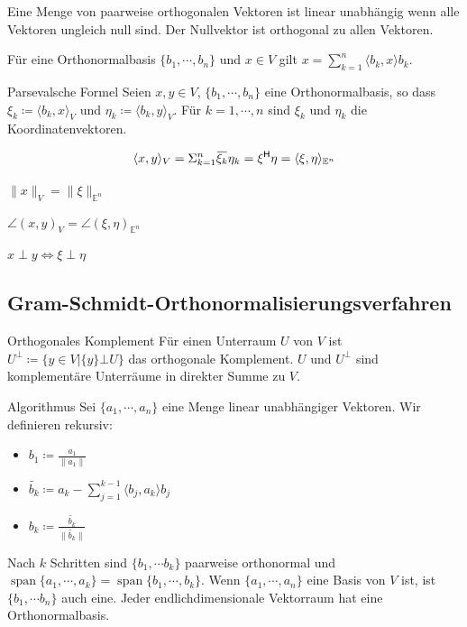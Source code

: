 \documentclass[a4paper,10pt]{article}
\DeclareMathOperator{\Span}{span}
\newcommand*{\hermconj}{\mathsf{H}}
\def\E{\mathbb{E}}
\newcommand{\overbar}[1]{\mkern 1.5mu\overline{\mkern-1.5mu#1\mkern-1.5mu}\mkern 1.5mu}
\begin{document}
Eine Menge von paarweise orthogonalen Vektoren ist linear unabhängig wenn alle Vektoren ungleich null sind. Der Nullvektor ist orthogonal zu allen Vektoren.

Für eine Orthonormalbasis $\{b_1, \cdots, b_n\}$ und $x \in V$ gilt $x = \sum_{k=1}^n \langle b_k, x \rangle b_k$.

\begin{mainbox}{Parsevalsche Formel}
  Seien $x, y \in V$, $\{ b_1, \cdots, b_n \}$ eine Orthonormalbasis, so dass $\xi_k \coloneqq \langle b_k, x \rangle_V$ und $\eta_k \coloneqq \langle b_k, y \rangle_V$. Für $k = 1, \cdots, n$ sind $\xi_k$ und $\eta_k$ die Koordinatenvektoren. 

  $$\langle x, y \rangle_V = \Sigma_{k=1}^n \overbar{\xi_k} \eta_k = \xi^\hermconj \eta = \langle \xi, \eta \rangle_{\E^n}$$

  \begin{rowlist}
    \item $\lVert x \rVert_V = \lVert \xi \rVert_{\E^n}$
    \item $\angle (x,y)_V = \angle (\xi, \eta)_{\E^n}$
    \item $x \perp y \iff \xi \perp \eta$
  \end{rowlist}
\end{mainbox}

\subsection{Gram-Schmidt-Orthonormalisierungsverfahren}

\begin{subbox}{Orthogonales Komplement}
  Für einen Unterraum $U$ von $V$ ist $U^\bot \coloneqq \{ y \in V | \{y\} \bot U \}$ das orthogonale Komplement. $U$ und $U^\bot$ sind komplementäre Unterräume in direkter Summe zu $V$.
\end{subbox}

\begin{mainbox}{Algorithmus}
  Sei $\{a_1, \cdots, a_n\}$ eine Menge linear unabhängiger Vektoren. Wir definieren rekursiv:
  \begin{itemize}
    \item $b_1 \coloneqq \frac{a_1}{\lVert a_1 \rVert}$
    \item $\widetilde{b_k} \coloneqq a_k - \sum_{j=1}^{k-1} \langle b_j, a_k \rangle b_j$
    \item $b_k \coloneqq \frac{\widetilde{b_k}}{\lVert \widetilde{b_k} \rVert}$
  \end{itemize}

  Nach $k$ Schritten sind $\{b_1, \cdots b_k\}$ paarweise orthonormal und $\Span \{a_1, \cdots, a_k\} = \Span \{b_1, \cdots, b_k\}$. Wenn $\{a_1, \cdots, a_n\}$ eine Basis von $V$ ist, ist $\{b_1, \cdots b_n\}$ auch eine. Jeder endlichdimensionale Vektorraum hat eine Orthonormalbasis.
\end{mainbox}
\end{document}
